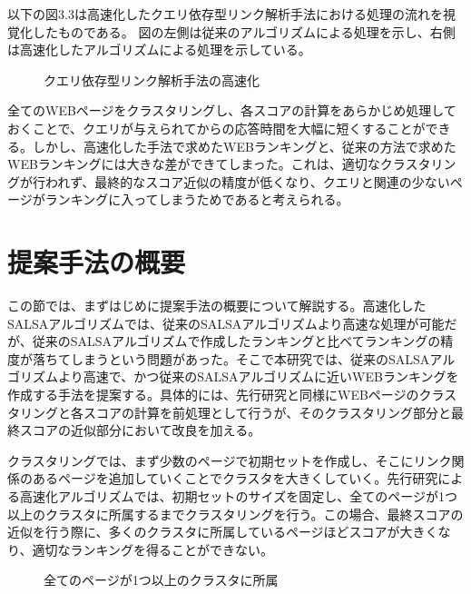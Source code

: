 \documentclass[a4paper,11pt]{jreport}
\begin{document}
以下の図3.3は高速化したクエリ依存型リンク解析手法における処理の流れを視覚化したものである。
図の左側は従来のアルゴリズムによる処理を示し、右側は高速化したアルゴリズムによる処理を示している。

\begin{figure}[htbp]
\begin{center}
\end{center}
\caption{クエリ依存型リンク解析手法の高速化}
\label{figure:sample}
\end{figure}

全てのWEBページをクラスタリングし、各スコアの計算をあらかじめ処理しておくことで、クエリが与えられてからの応答時間を大幅に短くすることができる。しかし、高速化した手法で求めたWEBランキングと、従来の方法で求めたWEBランキングには大きな差ができてしまった。これは、適切なクラスタリングが行われず、最終的なスコア近似の精度が低くなり、クエリと関連の少ないページがランキングに入ってしまうためであると考えられる。

\newpage

\section{提案手法の概要}

この節では、まずはじめに提案手法の概要について解説する。高速化したSALSAアルゴリズムでは、従来のSALSAアルゴリズムより高速な処理が可能だが、従来のSALSAアルゴリズムで作成したランキングと比べてランキングの精度が落ちてしまうという問題があった。そこで本研究では、従来のSALSAアルゴリズムより高速で、かつ従来のSALSAアルゴリズムに近いWEBランキングを作成する手法を提案する。具体的には、先行研究と同様にWEBページのクラスタリングと各スコアの計算を前処理として行うが、そのクラスタリング部分と最終スコアの近似部分において改良を加える。

クラスタリングでは、まず少数のページで初期セットを作成し、そこにリンク関係のあるページを追加していくことでクラスタを大きくしていく。先行研究による高速化アルゴリズムでは、初期セットのサイズを固定し、全てのページが1つ以上のクラスタに所属するまでクラスタリングを行う。この場合、最終スコアの近似を行う際に、多くのクラスタに所属しているページほどスコアが大きくなり、適切なランキングを得ることができない。

\begin{figure}[htbp]
\begin{center}
\end{center}
\caption{全てのページが1つ以上のクラスタに所属}
\label{figure:sample}
\end{figure}
\end{document}
